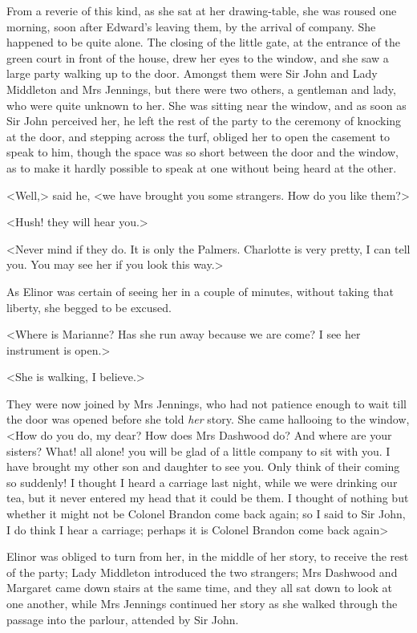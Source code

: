 From a reverie of this kind, as she sat at her drawing-table, she was roused one morning, soon after Edward's leaving them, by the arrival of company. She happened to be quite alone. The closing of the little gate, at the entrance of the green court in front of the house, drew her eyes to the window, and she saw a large party walking up to the door. Amongst them were Sir John and Lady Middleton and Mrs Jennings, but there were two others, a gentleman and lady, who were quite unknown to her. She was sitting near the window, and as soon as Sir John perceived her, he left the rest of the party to the ceremony of knocking at the door, and stepping across the turf, obliged her to open the casement to speak to him, though the space was so short between the door and the window, as to make it hardly possible to speak at one without being heard at the other.

<Well,> said he, <we have brought you some strangers. How do you like them?>

<Hush! they will hear you.>

<Never mind if they do. It is only the Palmers. Charlotte is very pretty, I can tell you. You may see her if you look this way.>

As Elinor was certain of seeing her in a couple of minutes, without taking that liberty, she begged to be excused.

<Where is Marianne? Has she run away because we are come? I see her instrument is open.>

<She is walking, I believe.>

They were now joined by Mrs Jennings, who had not patience enough to wait till the door was opened before she told \textit{her} story. She came hallooing to the window, <How do you do, my dear? How does Mrs Dashwood do? And where are your sisters? What! all alone! you will be glad of a little company to sit with you. I have brought my other son and daughter to see you. Only think of their coming so suddenly! I thought I heard a carriage last night, while we were drinking our tea, but it never entered my head that it could be them. I thought of nothing but whether it might not be Colonel Brandon come back again; so I said to Sir John, I do think I hear a carriage; perhaps it is Colonel Brandon come back again\longdash>

Elinor was obliged to turn from her, in the middle of her story, to receive the rest of the party; Lady Middleton introduced the two strangers; Mrs Dashwood and Margaret came down stairs at the same time, and they all sat down to look at one another, while Mrs Jennings continued her story as she walked through the passage into the parlour, attended by Sir John.

